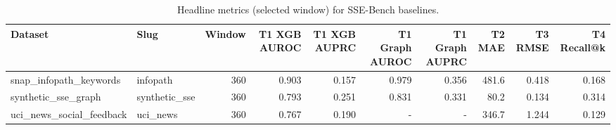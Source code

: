 \begin{table}[t]
\centering
\caption{Headline metrics (selected window) for SSE-Bench baselines.}
\label{tab:ssebench\_headline\_metrics}
\begin{tabular}{llrrrrrrrr}
\toprule
Dataset & Slug & Window & T1 XGB AUROC & T1 XGB AUPRC & T1 Graph AUROC & T1 Graph AUPRC & T2 MAE & T3 RMSE & T4 Recall@k \\
\midrule
snap\_infopath\_keywords & infopath & 360 & 0.903 & 0.157 & 0.979 & 0.356 & 481.6 & 0.418 & 0.168 \\
synthetic\_sse\_graph & synthetic\_sse & 360 & 0.793 & 0.251 & 0.831 & 0.331 & 80.2 & 0.134 & 0.314 \\
uci\_news\_social\_feedback & uci\_news & 360 & 0.767 & 0.190 & - & - & 346.7 & 1.244 & 0.129 \\
\bottomrule
\end{tabular}
\end{table}
